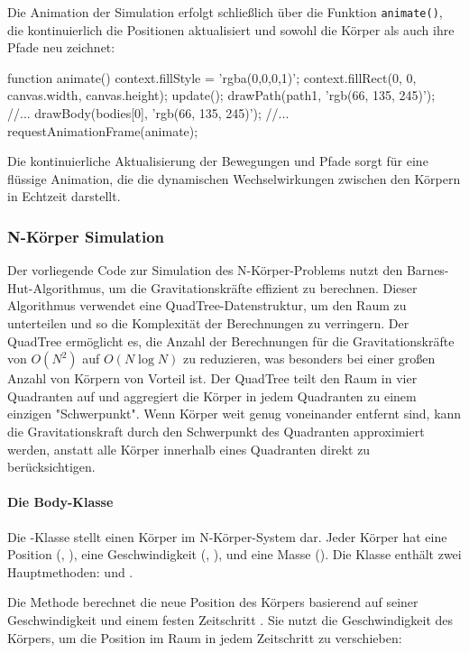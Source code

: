 \documentclass[a4paper,12pt,twoside]{article}
\begin{document}
Die Animation der Simulation erfolgt schließlich über die Funktion \texttt{animate()}, die kontinuierlich die Positionen aktualisiert und sowohl die Körper als auch ihre Pfade neu zeichnet:

\begin{javascript}
function animate() {
    context.fillStyle = 'rgba(0,0,0,1)';
    context.fillRect(0, 0, canvas.width, canvas.height);
    update();
    drawPath(path1, 'rgb(66, 135, 245)');
    //...
    drawBody(bodies[0], 'rgb(66, 135, 245)');
	//...
    requestAnimationFrame(animate);
}
\end{javascript}
Die kontinuierliche Aktualisierung der Bewegungen und Pfade sorgt für eine flüssige Animation, die die dynamischen Wechselwirkungen zwischen den Körpern in Echtzeit darstellt.

\subsubsection{N-Körper Simulation}

Der vorliegende Code zur Simulation des N-Körper-Problems nutzt den Barnes-Hut-Algorithmus, um die Gravitationskräfte effizient zu berechnen. Dieser Algorithmus verwendet eine QuadTree-Datenstruktur, um den Raum zu unterteilen und so die Komplexität der Berechnungen zu verringern. Der QuadTree ermöglicht es, die Anzahl der Berechnungen für die Gravitationskräfte von \(O(N^2)\) auf \(O(N \log N)\) zu reduzieren, was besonders bei einer großen Anzahl von Körpern von Vorteil ist. Der QuadTree teilt den Raum in vier Quadranten auf und aggregiert die Körper in jedem Quadranten zu einem einzigen "Schwerpunkt". Wenn Körper weit genug voneinander entfernt sind, kann die Gravitationskraft durch den Schwerpunkt des Quadranten approximiert werden, anstatt alle Körper innerhalb eines Quadranten direkt zu berücksichtigen.

\paragraph{Die Body-Klasse}
Die -Klasse stellt einen Körper im N-Körper-System dar. Jeder Körper hat eine Position (, ), eine Geschwindigkeit (, ), und eine Masse (). Die Klasse enthält zwei Hauptmethoden:  und .

Die Methode  berechnet die neue Position des Körpers basierend auf seiner Geschwindigkeit und einem festen Zeitschritt . Sie nutzt die Geschwindigkeit des Körpers, um die Position im Raum in jedem Zeitschritt zu verschieben:
\end{document}
